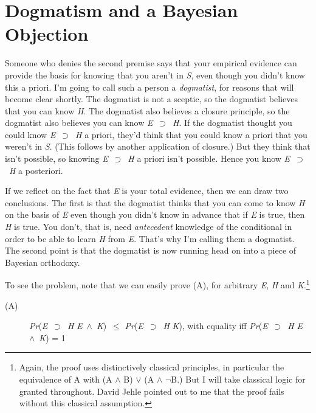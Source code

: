 \documentclass[
  11pt,
  letterpaper,
  DIV=11,
  numbers=noendperiod,
  oneside]{scrartcl}
\begin{document}
\section{Dogmatism and a Bayesian
Objection}\label{dogmatism-and-a-bayesian-objection}

Someone who denies the second premise says that your empirical evidence
can provide the basis for knowing that you aren't in \emph{S}, even
though you didn't know this a priori. I'm going to call such a person a
\emph{dogmatist}, for reasons that will become clear shortly. The
dogmatist is not a sceptic, so the dogmatist believes that you can know
\emph{H}. The dogmatist also believes a closure principle, so the
dogmatist also believes you can know \emph{E}~\({\supset}\)~\emph{H}. If
the dogmatist thought you could know \emph{E}~\({\supset}\)~\emph{H} a
priori, they'd think that you could know a priori that you weren't in
\emph{S}. (This follows by another application of closure.) But they
think that isn't possible, so knowing \emph{E}~\({\supset}\)~\emph{H} a
priori isn't possible. Hence you know \emph{E}~\({\supset}\)~\emph{H} a
posteriori.

If we reflect on the fact that \emph{E} is your total evidence, then we
can draw two conclusions. The first is that the dogmatist thinks that
you can come to know \emph{H} on the basis of \emph{E} even though you
didn't know in advance that if \emph{E} is true, then \emph{H} is true.
You don't, that is, need \emph{antecedent} knowledge of the conditional
in order to be able to learn \emph{H} from \emph{E}. That's why I'm
calling them a dogmatist. The second point is that the dogmatist is now
running head on into a piece of Bayesian orthodoxy.

To see the problem, note that we can easily prove (A), for arbitrary
\emph{E}, \emph{H} and \emph{K}.\footnote{Again, the proof uses
  distinctively classical principles, in particular the equivalence of A
  with (A \({\wedge}\) B) \({\vee}\) (A \({\wedge}\) \({\lnot}\)B.) But
  I will take classical logic for granted throughout. David Jehle
  pointed out to me that the proof fails without this classical
  assumption.}

\begin{description}
\item[(A)]
\emph{Pr}(\emph{E}~\({\supset}\)~\emph{H}
\emph{E}~\({\wedge}\)~\emph{K})~\({\leq}\)
\emph{Pr}(\emph{E}~\({\supset}\)~\emph{H} \emph{K}), with equality iff
\emph{Pr}(\emph{E}~\({\supset}\)~\emph{H}
\emph{E}~\({\wedge}\)~\emph{K}) = 1
\end{description}
\end{document}
